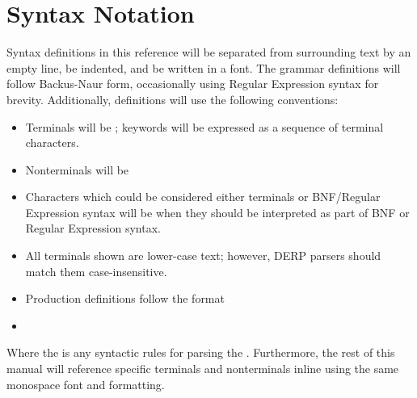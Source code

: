 \section{Syntax Notation}
Syntax definitions in this reference will be separated from surrounding text by an empty line,
be indented, and be written in a  font. The grammar definitions will follow Backus-Naur form,
occasionally using Regular Expression syntax for brevity. Additionally, definitions will use the following conventions:

\begin{itemize}
\item Terminals will be ; keywords will be expressed as a sequence of terminal characters.
\item Nonterminals will be 
\item Characters which could be considered either terminals or BNF/Regular Expression syntax will be  when they should be interpreted as part of BNF or Regular Expression syntax.
\item All terminals shown are lower-case text; however, DERP parsers should match them case-insensitive.
\item Production definitions follow the format
\end{itemize}

\begin{itemize}[leftmargin=1.5in]
    \item[\nonterminal{nonterminal}] \bnf{:} 
\end{itemize}

Where the  is any syntactic rules for parsing the .
Furthermore,  the rest of this manual will reference specific terminals and nonterminals inline using the same monospace font and formatting.

